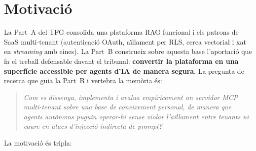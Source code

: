 \section{Motivació}
\label{sec:motivacio}

La Part~A del TFG consolida una plataforma RAG funcional i els patrons
de SaaS multi-tenant (autenticació OAuth, aïllament per RLS, cerca
vectorial i xat en \emph{streaming} amb eines). La Part~B construeix
sobre aquesta base l'aportació que fa el treball defensable davant el
tribunal: \textbf{convertir la plataforma en una superfície accessible
per agents d'IA de manera segura}. La pregunta de recerca que guia la
Part~B i vertebra la memòria és:

\begin{quote}
  \emph{Com es dissenya, implementa i avalua empíricament un servidor MCP
  multi-tenant sobre una base de coneixement personal, de manera que
  agents autònoms puguin operar-hi sense violar l'aïllament entre
  tenants ni caure en atacs d'injecció indirecta de prompt?}
\end{quote}

La motivació és tripla:

